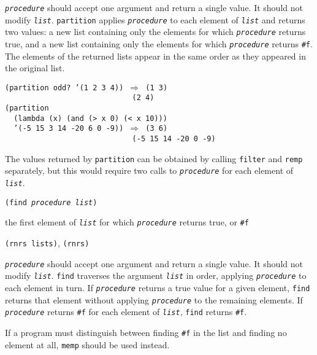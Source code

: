 \texttt{\textit{procedure}} should accept one argument and return a single value.
It should not modify \texttt{\textit{list}}.
\texttt{partition} applies \texttt{\textit{procedure}} to each element of \texttt{\textit{list}}
and returns two values:
a new list containing only the elements for which
\texttt{\textit{procedure}} returns true, and
a new list containing only the elements for which
\texttt{\textit{procedure}} returns \texttt{\#{}f}.
The elements of the returned lists appear in the same order as they
appeared in the original list.

\begin{alltt}
(partition odd? '(1 2 3 4)) \(\Rightarrow\) (1 3)
                             (2 4)
(partition
  (lambda (x) (and (\textgreater{} x 0) (\textless{} x 10)))
  '(-5 15 3 14 -20 6 0 -9)) \(\Rightarrow\) (3 6)
                             (-5 15 14 -20 0 -9)
\end{alltt}


The values returned by \texttt{partition} can be obtained by calling
\texttt{filter} and \texttt{remp} separately, but this would require
two calls to \texttt{\textit{procedure}} for each element of \texttt{\textit{list}}.

\begin{description}

\label{objects_s57}\item[procedure] \texttt{(find \textit{procedure} \textit{list})}



\item[returns] the first element of \texttt{\textit{list}} for which \texttt{\textit{procedure}} returns true, or \texttt{\#{}f}


\item[libraries] \texttt{(rnrs lists)}, \texttt{(rnrs)}
\end{description}

\texttt{\textit{procedure}} should accept one argument and return a single value.
It should not modify \texttt{\textit{list}}.
\texttt{find} traverses the argument \texttt{\textit{list}} in order, applying
\texttt{\textit{procedure}} to each element in turn.
If \texttt{\textit{procedure}} returns a true value for a given element, \texttt{find}
returns that element without applying \texttt{\textit{procedure}} to the remaining elements.
If \texttt{\textit{procedure}} returns \texttt{\#{}f} for each element of \texttt{\textit{list}},
\texttt{find} returns \texttt{\#{}f}.

If a program must distinguish between finding \texttt{\#{}f} in the list
and finding no element at all, \texttt{memp} should be used instead.


